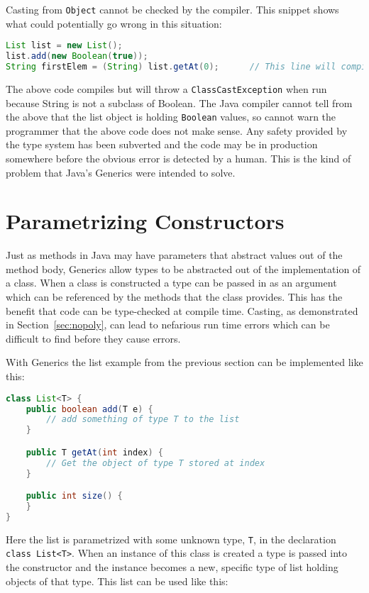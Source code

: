 Casting from \lstinline{Object} cannot be checked by the compiler. This snippet
shows what could potentially go wrong in this situation:

\begin{lstlisting}[nolol, language=Java, label={lst:casterr}]
List list = new List();
list.add(new Boolean(true));
String firstElem = (String) list.getAt(0);      // This line will compile, but is obviously wrong
\end{lstlisting}

The above code compiles but will throw a \lstinline{ClassCastException} when
run because String is not a subclass of Boolean. The Java compiler cannot tell
from the above that the list object is holding \lstinline{Boolean} values, so
cannot warn the programmer that the above code does not make sense. Any safety
provided by the type system has been subverted and the code may be in
production somewhere before the obvious error is detected by a human. This is
the kind of problem that Java's Generics were intended to solve.

\section{Parametrizing Constructors}
Just as methods in Java may have parameters that abstract values out of the
method body, Generics allow types to be abstracted out of the implementation of
a class. When a class is constructed a type can be passed in as an argument
which can be referenced by the methods that the class provides. This has the
benefit that code can be type-checked at compile time. Casting, as demonstrated
in Section~\ref{sec:nopoly}, can lead to nefarious run time errors which can be
difficult to find before they cause errors.

With Generics the list example from the previous section can be implemented
like this:

\begin{lstlisting}[caption={List class with Generics}, language=Java, label={lst:genericlist}]
class List<T> {
    public boolean add(T e) {
        // add something of type T to the list
    }

    public T getAt(int index) {
        // Get the object of type T stored at index
    }

    public int size() {
    }
}
\end{lstlisting}

Here the list is parametrized with some unknown type, \lstinline{T}, in the
declaration \lstinline{class List<T>}. When an instance of this class is
created a type is passed into the constructor and the instance becomes a new,
specific type of list holding objects of that type. This list can be used like
this:

